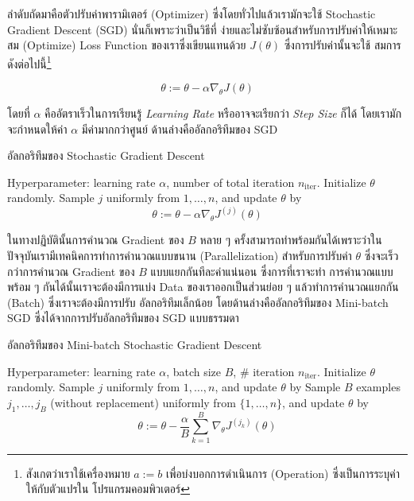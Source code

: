 ลำดับถัดมาคือตัวปรับค่าพารามิเตอร์ (Optimizer) ซึ่งโดยทั่วไปแล้วเรามักจะใช้ Stochastic Gradient Descent (SGD) นั่นก็เพราะว่าเป็นวิธีที่%
ง่ายและไม่ซับซ้อนสำหรับการปรับค่าให้เหมาะสม (Optimize) Loss Function ของเราซึ่งเขียนแทนด้วย $J(\theta)$ ซึ่งการปรับค่านั้นจะใช้%
สมการดังต่อไปนี้\footnote{สังเกตว่าเราใช้เครื่องหมาย $a := b$ เพื่อบ่งบอกการดำเนินการ (Operation) ซึ่งเป็นการระบุค่าให้กับตัวแปรใน%
โปรแกรมคอมพิวเตอร์}

\begin{equation}
    \theta := \theta - \alpha\nabla_\theta J(\theta)
\end{equation}

\noindent โดยที่ $\alpha$ คืออัตราเร็วในการเรียนรู้ \textit{Learning Rate} หรืออาจจะเรียกว่า \textit{Step Size} ก็ได้ 
โดยเรามักจะกำหนดให้ค่า $\alpha$ มีค่ามากกว่าศูนย์ ด้านล่างคืออัลกอริทึมของ SGD

\begin{algorithm}[ht]
    \caption{อัลกอริทึมของ Stochastic Gradient Descent}
    \label{alg:sgd_dl}
    \begin{algorithmic}
    \State Hyperparameter: learning rate $\alpha$, number of total iteration $n_\text{iter}$.
    \State Initialize $\theta$ randomly.
        \State Sample $j$ uniformly from ${1,\ldots,n}$, and update $\theta$ by
        \begin{equation*}
            \theta := \theta - \alpha\nabla_\theta J^{(j)}(\theta)
        \end{equation*}
    \EndFor
    \end{algorithmic}
\end{algorithm}

ในทางปฏิบัตินั้นการคำนวณ Gradient ของ $B$ หลาย ๆ ครั้งสามารถทำพร้อมกันได้เพราะว่าในปัจจุบันเรามีเทคนิคการทำการคำนวณแบบขนาน 
(Parallelization) สำหรับการปรับค่า $\theta$ ซึ่งจะเร็วกว่าการคำนวณ Gradient ของ $B$ แบบแยกกันทีละค่าแน่นอน ซึ่งการที่เราจะทำ%
การคำนวณแบบพร้อม ๆ กันได้นั้นเราจะต้องมีการแบ่ง Data ของเราออกเป็นส่วนย่อย ๆ แล้วทำการคำนวณแยกกัน (Batch) ซึ่งเราจะต้องมีการปรับ%
อัลกอริทึมเล็กน้อย โดยด้านล่างคืออัลกอริทึมของ Mini-batch SGD ซึ่งได้จากการปรับอัลกอริทึมของ SGD แบบธรรมดา  

\begin{algorithm}[ht]
    \caption{อัลกอริทึมของ Mini-batch Stochastic Gradient Descent}
    \label{alg:sgd_minibatch}
    \begin{algorithmic}
    \State Hyperparameter: learning rate $\alpha$, batch size $B$, \# iteration $n_\text{iter}$.
    \State Initialize $\theta$ randomly.
        \State Sample $j$ uniformly from ${1,\ldots,n}$, and update $\theta$ by
        \State Sample $B$ examples $j_1,\ldots,j_B$ (without replacement) uniformly from $\{1,\ldots,n\}$, 
        and update $\theta$ by
        \begin{equation*}
            \theta := \theta - \frac{\alpha}{B}\sum_{k=1}^B\nabla_\theta J^{(j_k)}(\theta)
        \end{equation*}
    \EndFor
    \end{algorithmic}
\end{algorithm}

